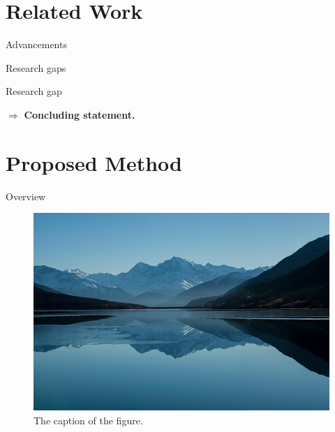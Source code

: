 \documentclass{beamer}
\begin{document}
\section{Related Work}

\begin{frame}{Advancements}
	\note{}
\end{frame}

\begin{frame}{Research gaps}
	\begin{alertblock}{Research gap}
	\end{alertblock}
																
	$\Rightarrow$ \textbf{Concluding statement.}
																
	\note{}
\end{frame}

		 
\section{Proposed Method} 

\begin{frame}{Overview}
	\begin{figure}
		\centering
		\includegraphics[width=.8\linewidth]{samplel.png}
		\caption{The caption of the figure.}
	\end{figure}	
	\note{}
\end{frame}
\end{document}
